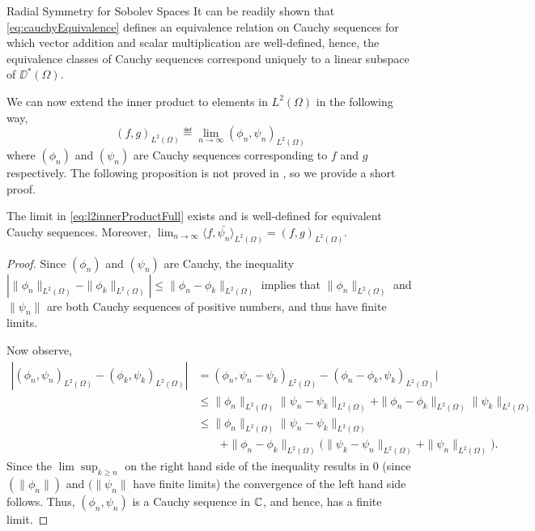 \begin{chapter}{Radial Symmetry for Sobolev Spaces}
It can be readily shown that \eqref{eq:cauchyEquivalence} defines an equivalence relation on Cauchy sequences for which vector addition and scalar multiplication are well-defined, hence, the equivalence classes of Cauchy sequences correspond uniquely to a linear subspace of $\DD^*(\Omega)$.

We can now extend the inner product to elements in $L^2(\Omega)$ in the following way,
\begin{equation} \label{eq:l2innerProductFull}
  (f,g)_{L^2(\Omega)} \eqdef \lim_{n\to\infty} (\phi_n,\psi_n)_{L^2(\Omega)}
\end{equation}
where $(\phi_n)$ and $(\psi_n)$ are Cauchy sequences corresponding to $f$ and $g$ respectively.
The following proposition is not proved in \citep{richtmyer1978principles}, so we provide a short proof.
\begin{prop}
  The limit in \eqref{eq:l2innerProductFull} exists and is well-defined for equivalent Cauchy sequences. 
  Moreover, $\lim_{n\to\infty} \langle f,\bar{\psi_n}\rangle _{L^2(\Omega)} = (f,g)_{L^2(\Omega)}$.
\end{prop}
\begin{proof}
  Since $(\phi_n)$ and $(\psi_n)$ are Cauchy, the inequality $|\|\phi_n\|_{L^2(\Omega)} - \|\phi_k\|_{L^2(\Omega)}| \le \|\phi_n - \phi_k\|_{L^2(\Omega)}$ implies that $\|\phi_n\|_{L^2(\Omega)}$ and $\|\psi_n\|$ are both Cauchy sequences of positive numbers, and thus have finite limits.

Now observe,
\begin{align}
  |(\phi_n,\psi_n)_{L^2(\Omega)} - (\phi_k,\psi_k)_{L^2(\Omega)}| 
    &= (\phi_n,\psi_n-\psi_k)_{L^2(\Omega)} -(\phi_n-\phi_k,\psi_k)_{L^2(\Omega)}| \nonumber\\
    &\le \|\phi_n\|_{L^2(\Omega)}\|\psi_n-\psi_k\|_{L^2(\Omega)} + \|\phi_n - \phi_k\|_{L^2(\Omega)}\|\psi_k\|_{L^2(\Omega)} \nonumber\\
    &\le \|\phi_n\|_{L^2(\Omega)}\|\psi_n-\psi_k\|_{L^2(\Omega)} \nonumber\\
    &\quad\quad+ \|\phi_n - \phi_k\|_{L^2(\Omega)}\big(\|\psi_k - \psi_n\|_{L^2(\Omega)} + \|\psi_n\|_{L^2(\Omega)}\big).
\end{align}
  Since the $\lim \sup_{k\ge n}$ on the right hand side of the inequality results in 0 (since $(\|\phi_n\|)$ and $(\|\psi_n\|$ have finite limits) the convergence of the left hand side follows.
Thus, $(\phi_n,\psi_n)$ is a Cauchy sequence in $\mathbb C$, and hence, has a finite limit.


\end{proof}
\end{chapter}
